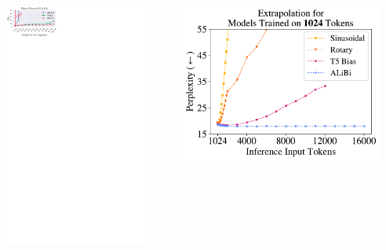 \documentclass[notheorems,10pt]{beamer}
\begin{document}
\begin{frame}
        \begin{columns}
        \begin{center}
            \includegraphics[width=0.9\textwidth]{attachments/extrapolation_1.pdf}
        \end{center}
        \begin{center}
            \includegraphics[width=0.9\textwidth]{attachments/extrapolation_2.pdf}
        \end{center}
        \end{columns}
        
\end{frame}
\end{document}
